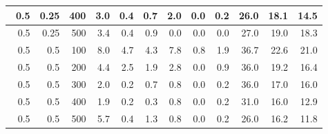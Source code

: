 \begin{longtable}{|r|r|r|r|r|r|r|r|r|r|r|r|}
    \hline \
    0.5                            & 0.25                     & 400                       & 3.0                       & 0.4                       & 0.7                       & 2.0                       & 0.0                       & 0.2                       & 26.0                      & 18.1                      & 14.5                      \\
    \hline \
    0.5                            & 0.25                     & 500                       & 3.4                       & 0.4                       & 0.9                       & 0.0                       & 0.0                       & 0.0                       & 27.0                      & 19.0                      & 18.3                      \\
    \hline \
    0.5                            & 0.5                     & 100                       & 8.0                       & 4.7                       & 4.3                       & 7.8                       & 0.8                       & 1.9                       & 36.7                      & 22.6                      & 21.0                      \\
    \hline \
    0.5                            & 0.5                     & 200                       & 4.4                       & 2.5                       & 1.9                       & 2.8                       & 0.0                       & 0.9                       & 36.0                      & 19.2                      & 16.4                      \\
    \hline \
    0.5                            & 0.5                     & 300                       & 2.0                       & 0.2                       & 0.7                       & 0.8                       & 0.0                       & 0.2                       & 36.0                      & 17.0                      & 16.0                      \\
    \hline \
    0.5                            & 0.5                    & 400                       & 1.9                       & 0.2                       & 0.3                       & 0.8                       & 0.0                       & 0.2                       & 31.0                      & 16.0                      & 12.9                      \\
    \hline \
    0.5                            & 0.5                    & 500                       & 5.7                       & 0.4                       & 1.3                       & 0.8                       & 0.0                       & 0.2                       & 26.0                      & 16.2                      & 11.8                      \\

\end{longtable}
